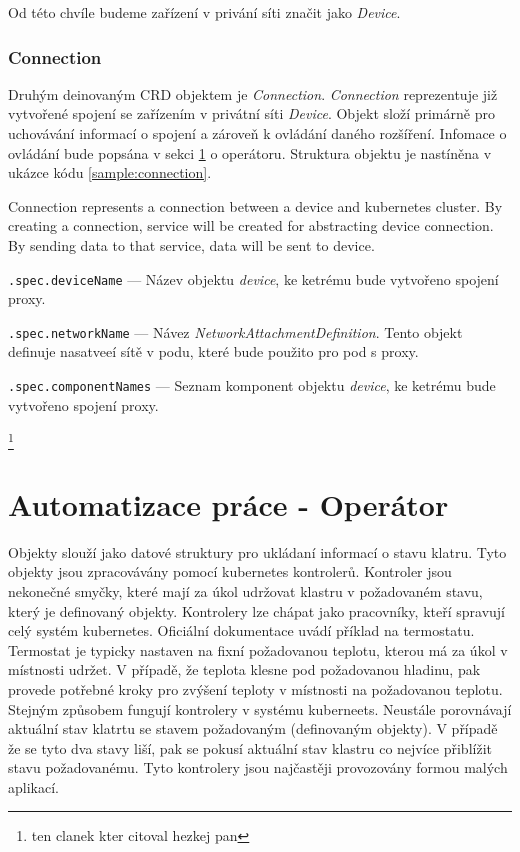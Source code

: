Od této chvíle budeme zařízení v privání síti značit jako \textit{Device}.

\subsubsection{Connection}
Druhým deinovaným CRD objektem je \textit{Connection}. \textit{Connection} reprezentuje již vytvořené spojení se zařízením v privátní síti \textit{Device}. Objekt složí primárně pro uchovávání informací o spojení a zároveň k ovládání daného rozšíření. Infomace o ovládání bude popsána v sekci \ref{sec:operator} o operátoru. Struktura objektu je nastíněna v ukázce kódu \ref{sample:connection}.


Connection represents a connection between a device and kubernetes cluster. By creating a connection, service will be created for abstracting device connection. By sending data to that service, data will be sent to device.




\begin{description}
    \item \verb|.spec.deviceName| --- Název objektu \textit{device}, ke ketrému bude vytvořeno spojení proxy. 
    \item \verb|.spec.networkName| --- Návez \textit{NetworkAttachmentDefinition}. Tento objekt definuje nasatveeí sítě v podu, které bude použito pro pod s proxy.
    \item \verb|.spec.componentNames| --- Seznam komponent objektu \textit{device}, ke ketrému bude vytvořeno spojení proxy. 
\end{description}
\footnote{ten clanek kter citoval hezkej pan}
\section{Automatizace práce - Operátor}\label{sec:operator}
Objekty slouží jako datové struktury pro ukládaní informací o stavu klatru. Tyto objekty jsou zpracovávány pomocí kubernetes kontrolerů. Kontroler jsou nekonečné smyčky, které mají za úkol udržovat klastru v požadovaném stavu, který je definovaný objekty. Kontrolery lze chápat jako pracovníky, kteří spravují celý systém kubernetes. Oficiální dokumentace uvádí příklad na termostatu. Termostat je typicky nastaven na fixní požadovanou teplotu, kterou má za úkol v místnosti udržet. V případě, že teplota klesne pod požadovanou hladinu, pak provede potřebné kroky pro zvýšení teploty v místnosti na požadovanou teplotu. Stejným způsobem fungují kontrolery v systému kuberneets. Neustále porovnávají aktuální stav klatrtu se stavem požadovaným (definovaným objekty). V případě že se tyto dva stavy liší, pak se pokusí aktuální stav klastru co nejvíce přiblížit stavu požadovanému. Tyto kontrolery jsou najčastěji provozovány formou malých aplikací.

